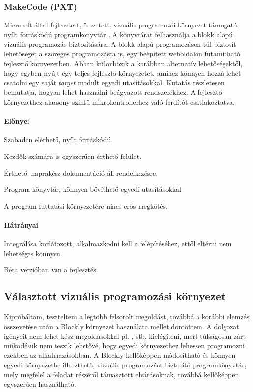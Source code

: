 \documentclass[12pt,a4paper,oneside]{report} %
\begin{document}
\subsubsection{MakeCode (PXT)}
\label{pxt}
Microsoft által fejlesztett, összetett, vizuális programozói környezet támogató, nyílt forráskódú programkönyvtár \cite{seneviratne2019makecode}. A  könyvtárat felhasználja a blokk alapú vizuális programozás biztosítására. A blokk alapú programozáson túl biztosít lehetőséget a szöveges programozásra is, egy beépített weboldalon futamítható fejlesztő környezetben. Abban különbözik a korábban alternatív lehetőségektől, hogy egyben nyújt egy teljes fejlesztő környezetet, amihez könnyen hozzá lehet csatolni egy saját \textit{target} modult egyedi utasításokkal. \cite{devine2018makecode} Kutatás részletesen bemutatja, hogyan lehet használni beágyazott rendszerekhez. A fejlesztő környezethez alacsony szintű mikrokontrollerhez való fordítót csatlakoztatva.
\paragraph{Előnyei} 
\begin{compactitem}
	\item Szabadon elérhető, nyílt forráskódú.
	\item Kezdők számára is egyszerűen érthető felület.
	\item Érthető, naprakész dokumentáció áll rendelkezésre.
	\item Program könyvtár, könnyen bővíthető egyedi utasításokkal
	\item A program futtatási környezetére nincs erős megkötés.
\end{compactitem}
\paragraph{Hátrányai} 
\begin{compactitem}
	\item Integrálása korlátozott, alkalmazkodni kell a felépítéséhez, ettől eltérni nem lehetséges könnyen.
	\item Béta verzióban van a fejlesztés.
\end{compactitem}

\subsection{Választott vizuális programozási környezet}
Kipróbáltam, teszteltem a legtöbb felsorolt megoldást, továbbá a korábbi elemzés összevetése  után a Blockly környezet használata mellet döntöttem.
A dolgozat igényeit nem lehet kész megoldásokkal pl. ,  stb. kielégíteni, mert túlságosan zárt működésük nem teszik lehetővé, hogy egyedi környezethez lehessen programozni ezekben az alkalmazásokban.
A Blockly kellőképpen módosítható és könnyen egyedi környezetbe illeszthető, vizuális programozást biztosító programkönyvtár, mely megfelel a feladat részéről támasztott elvárásoknak, továbbá kellőképpen egyszerűen használható.
\end{document}
